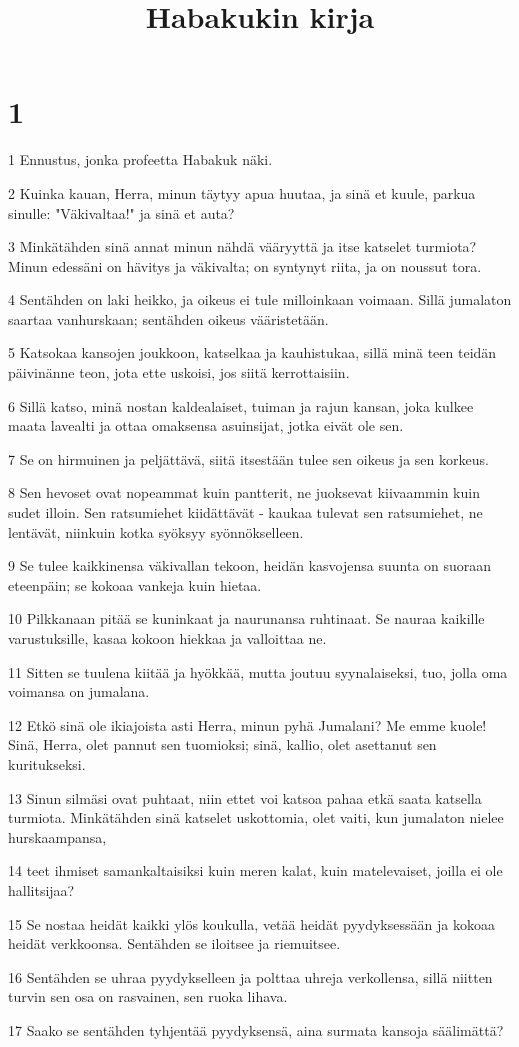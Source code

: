 

\title{Habakukin kirja}


\chapter{1}

\par 1 Ennustus, jonka profeetta Habakuk näki.
\par 2 Kuinka kauan, Herra, minun täytyy apua huutaa, ja sinä et kuule, parkua sinulle: "Väkivaltaa!" ja sinä et auta?
\par 3 Minkätähden sinä annat minun nähdä vääryyttä ja itse katselet turmiota? Minun edessäni on hävitys ja väkivalta; on syntynyt riita, ja on noussut tora.
\par 4 Sentähden on laki heikko, ja oikeus ei tule milloinkaan voimaan. Sillä jumalaton saartaa vanhurskaan; sentähden oikeus vääristetään.
\par 5 Katsokaa kansojen joukkoon, katselkaa ja kauhistukaa, sillä minä teen teidän päivinänne teon, jota ette uskoisi, jos siitä kerrottaisiin.
\par 6 Sillä katso, minä nostan kaldealaiset, tuiman ja rajun kansan, joka kulkee maata lavealti ja ottaa omaksensa asuinsijat, jotka eivät ole sen.
\par 7 Se on hirmuinen ja peljättävä, siitä itsestään tulee sen oikeus ja sen korkeus.
\par 8 Sen hevoset ovat nopeammat kuin pantterit, ne juoksevat kiivaammin kuin sudet illoin. Sen ratsumiehet kiidättävät - kaukaa tulevat sen ratsumiehet, ne lentävät, niinkuin kotka syöksyy syönnökselleen.
\par 9 Se tulee kaikkinensa väkivallan tekoon, heidän kasvojensa suunta on suoraan eteenpäin; se kokoaa vankeja kuin hietaa.
\par 10 Pilkkanaan pitää se kuninkaat ja naurunansa ruhtinaat. Se nauraa kaikille varustuksille, kasaa kokoon hiekkaa ja valloittaa ne.
\par 11 Sitten se tuulena kiitää ja hyökkää, mutta joutuu syynalaiseksi, tuo, jolla oma voimansa on jumalana.
\par 12 Etkö sinä ole ikiajoista asti Herra, minun pyhä Jumalani? Me emme kuole! Sinä, Herra, olet pannut sen tuomioksi; sinä, kallio, olet asettanut sen kuritukseksi.
\par 13 Sinun silmäsi ovat puhtaat, niin ettet voi katsoa pahaa etkä saata katsella turmiota. Minkätähden sinä katselet uskottomia, olet vaiti, kun jumalaton nielee hurskaampansa,
\par 14 teet ihmiset samankaltaisiksi kuin meren kalat, kuin matelevaiset, joilla ei ole hallitsijaa?
\par 15 Se nostaa heidät kaikki ylös koukulla, vetää heidät pyydyksessään ja kokoaa heidät verkkoonsa. Sentähden se iloitsee ja riemuitsee.
\par 16 Sentähden se uhraa pyydykselleen ja polttaa uhreja verkollensa, sillä niitten turvin sen osa on rasvainen, sen ruoka lihava.
\par 17 Saako se sentähden tyhjentää pyydyksensä, aina surmata kansoja säälimättä?

